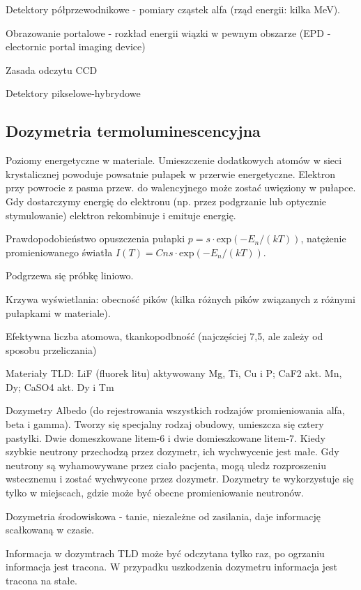\documentclass{article}
\begin{document}
Detektory półprzewodnikowe - pomiary cząstek alfa (rząd energii: kilka MeV).

Obrazowanie portalowe - rozkład energii wiązki w pewnym obszarze (EPD - electornic portal imaging device)

Zasada odczytu CCD

Detektory pikselowe-hybrydowe

\subsection{Dozymetria termoluminescencyjna}

Poziomy energetyczne w materiale. Umieszczenie dodatkowych atomów w sieci krystalicznej powoduje powsatnie pułapek w przerwie energetyczne. Elektron przy powrocie z pasma przew. do walencyjnego może zostać uwięziony w pułapce. Gdy dostarczymy energię do elektronu (np. przez podgrzanie lub optycznie stymulowanie) elektron rekombinuje i emituje energię.

Prawdopodobieństwo opuszczenia pułapki $p = s\cdot\mathrm{exp}(-E_n/(kT))$, natężenie promieniowanego światła $I(T) = C ns\cdot\mathrm{exp}(-E_n/(kT))$.

Podgrzewa się próbkę liniowo.

Krzywa wyświetlania: obecność pików (kilka różnych pików związanych z różnymi pułapkami w materiale).

Efektywna liczba atomowa, tkankopodbność (najczęściej 7,5, ale zależy od sposobu przeliczania)

Materiały TLD: LiF (fluorek litu) aktywowany Mg, Ti, Cu i P; CaF2 akt. Mn, Dy; CaSO4 akt. Dy i Tm

Dozymetry Albedo (do rejestrowania wszystkich rodzajów promieniowania alfa, beta i gamma). Tworzy się specjalny rodzaj obudowy, umieszcza się cztery pastylki. Dwie domeszkowane litem-6 i dwie domieszkowane litem-7. Kiedy szybkie neutrony przechodzą przez dozymetr, ich wychwycenie jest małe. Gdy neutrony są wyhamowywane przez ciało pacjenta, mogą uledz rozproszeniu wstecznemu i zostać wychwycone przez dozymetr. Dozymetry te wykorzystuje się tylko w miejscach, gdzie może być obecne promieniowanie neutronów.

Dozymetria środowiskowa - tanie, niezależne od zasilania, daje informację scałkowaną w czasie.

Informacja w dozymtrach TLD może być odczytana tylko raz, po ogrzaniu informacja jest tracona. W przypadku uszkodzenia dozymetru informacja jest tracona na stałe.
\end{document}
